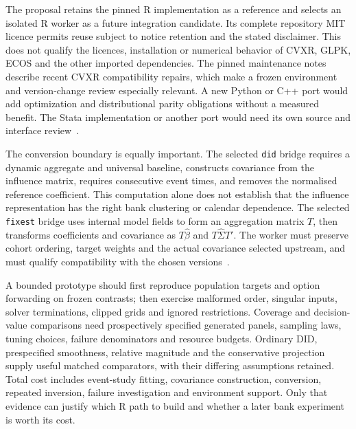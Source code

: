 The proposal retains the pinned R implementation as a reference and selects an
isolated R worker as a future integration candidate. Its complete repository
MIT licence permits reuse subject to notice retention and the stated disclaimer.
This does not qualify the licences, installation or numerical behavior of CVXR,
GLPK, ECOS and the other imported dependencies. The pinned maintenance notes
describe recent CVXR compatibility repairs, which make a frozen environment and
version-change review especially relevant. A new Python or C++ port would add
optimization and distributional parity obligations without a measured benefit.
The Stata implementation or another port would need its own source and interface
review~\citep{exec22_honestdid_engine}.

The conversion boundary is equally important. The selected \texttt{did} bridge
requires a dynamic aggregate and universal baseline, constructs covariance from
the influence matrix, requires consecutive event times, and removes the
normalised reference coefficient. This computation alone does not establish
that the influence representation has the right bank clustering or calendar
dependence. The selected \texttt{fixest} bridge uses internal model fields to
form an aggregation matrix $T$, then transforms coefficients and covariance as
$T\widehat\beta$ and $T\widehat\Sigma T'$. The worker must preserve cohort
ordering, target weights and the actual covariance selected upstream, and must
qualify compatibility with the chosen versions~\citep{exec22_honestdid_bridges}.

A bounded prototype should first reproduce population targets and option
forwarding on frozen contrasts; then exercise malformed order, singular inputs,
solver terminations, clipped grids and ignored restrictions. Coverage and
decision-value comparisons need prospectively specified generated panels,
sampling laws, tuning choices, failure denominators and resource budgets.
Ordinary DID, prespecified smoothness, relative magnitude and the conservative
projection supply useful matched comparators, with their differing assumptions
retained. Total cost includes event-study fitting, covariance construction,
conversion, repeated inversion, failure investigation and environment support.
Only that evidence can justify which R path to build and whether a later bank
experiment is worth its cost.
